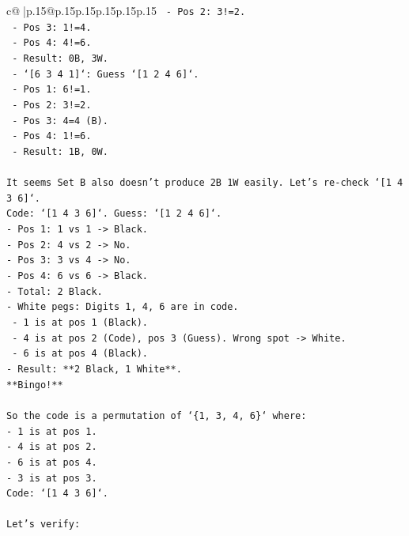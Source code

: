 \documentclass{article}
\begin{document}
{\begin{supertabular}{c@{$\;$}|p{.15\linewidth}@{}p{.15\linewidth}p{.15\linewidth}p{.15\linewidth}p{.15\linewidth}p{.15\linewidth}}
{{{\texttt{        {-} Pos 2: 3!=2.} \\
\texttt{        {-} Pos 3: 1!=4.} \\
\texttt{        {-} Pos 4: 4!=6.} \\
\texttt{        {-} Result: 0B, 3W.} \\
\texttt{    {-} `{[}6 3 4 1{]}`: Guess `{[}1 2 4 6{]}`.} \\
\texttt{        {-} Pos 1: 6!=1.} \\
\texttt{        {-} Pos 2: 3!=2.} \\
\texttt{        {-} Pos 3: 4=4 (B).} \\
\texttt{        {-} Pos 4: 1!=6.} \\
\texttt{        {-} Result: 1B, 0W.} \\
\\ 
\texttt{It seems Set B also doesn't produce 2B 1W easily. Let's re{-}check `{[}1 4 3 6{]}`.} \\
\texttt{Code: `{[}1 4 3 6{]}`. Guess: `{[}1 2 4 6{]}`.} \\
\texttt{{-} Pos 1: 1 vs 1 {-}> Black.} \\
\texttt{{-} Pos 2: 4 vs 2 {-}> No.} \\
\texttt{{-} Pos 3: 3 vs 4 {-}> No.} \\
\texttt{{-} Pos 4: 6 vs 6 {-}> Black.} \\
\texttt{{-} Total: 2 Black.} \\
\texttt{{-} White pegs: Digits 1, 4, 6 are in code.} \\
\texttt{    {-} 1 is at pos 1 (Black).} \\
\texttt{    {-} 4 is at pos 2 (Code), pos 3 (Guess). Wrong spot {-}> White.} \\
\texttt{    {-} 6 is at pos 4 (Black).} \\
\texttt{{-} Result: **2 Black, 1 White**.} \\
\texttt{**Bingo!**} \\
\\ 
\texttt{So the code is a permutation of `\{1, 3, 4, 6\}` where:} \\
\texttt{{-} 1 is at pos 1.} \\
\texttt{{-} 4 is at pos 2.} \\
\texttt{{-} 6 is at pos 4.} \\
\texttt{{-} 3 is at pos 3.} \\
\texttt{Code: `{[}1 4 3 6{]}`.} \\
\\ 
\texttt{Let's verify:} \\
}}}
\end{supertabular}}
\end{document}
